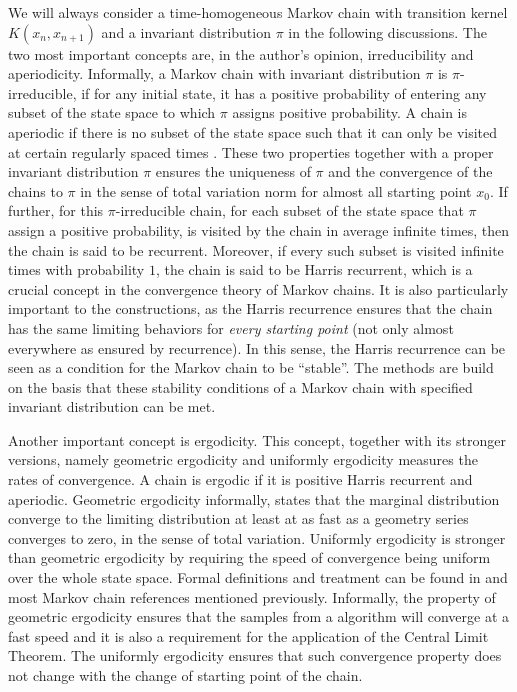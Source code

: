 We will always consider a time-homogeneous Markov chain with transition kernel
$K(x_n,x_{n+1})$ and a invariant distribution $\pi$ in the following
discussions. The two most important concepts are, in the author's opinion,
irreducibility and aperiodicity. Informally, a Markov chain with invariant
distribution $\pi$ is $\pi$-irreducible, if for any initial state, it has a
positive probability of entering any subset of the state space to which $\pi$
assigns positive probability. A chain is aperiodic if there is no subset of
the state space such that it can only be visited at certain regularly spaced
times \parencite{Tierney:1994uk}. These two properties together with a proper
invariant distribution $\pi$ ensures the uniqueness of $\pi$ and the
convergence of the chains to $\pi$ in the sense of total variation norm for
almost all starting point $x_0$. If further, for this $\pi$-irreducible chain,
for each subset of the state space that $\pi$ assign a positive probability,
is visited by the chain in average infinite times, then the chain is said to
be recurrent. Moreover, if every such subset is visited infinite times with
probability $1$, the chain is said to be Harris recurrent, which is a crucial
concept in the convergence theory of Markov chains. It is also particularly
important to the \mcmc constructions, as the Harris recurrence ensures that
the chain has the same limiting behaviors for \emph{every starting point} (not
only almost everywhere as ensured by recurrence). In this sense, the Harris
recurrence can be seen as a condition for the Markov chain to be ``stable''.
The \mcmc methods are build on the basis that these stability conditions of a
Markov chain with specified invariant distribution can be met.

Another important concept is ergodicity. This concept, together with its
stronger versions, namely geometric ergodicity and uniformly ergodicity
measures the rates of convergence. A chain is ergodic if it is positive Harris
recurrent and aperiodic. Geometric ergodicity informally, states that the
marginal distribution converge to the limiting distribution at least at as
fast as a geometry series converges to zero, in the sense of total variation.
Uniformly ergodicity is stronger than geometric ergodicity by requiring the
speed of convergence being uniform over the whole state space. Formal
definitions and treatment can be found in \textcite[][chap.~6]{Robert2004} and
most Markov chain references mentioned previously. Informally, the property of
geometric ergodicity ensures that the samples from a \mcmc algorithm will
converge at a fast speed and it is also a requirement for the application of
the Central Limit Theorem. The uniformly ergodicity ensures that such
convergence property does not change with the change of starting point of the
chain.

